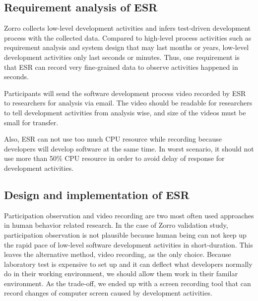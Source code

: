 \subsection{Requirement analysis of ESR}
Zorro collects low-level development activities and infers test-driven
development process with the collected data. Compared to high-level process
activities such as requirement analysis and system design that may last
months or years, low-level development activities only last seconds or
minutes. Thus, one requirement is that ESR can record very fine-grained
data to observe activities happened in seconds.

Participants will send the software development process video recorded by
ESR to researchers for analysis via email. The video should be readable for
researchers to tell development activities from analysis wise, and size of
the videos must be small for transfer. 

Also, ESR can not use too much CPU resource while recording because
developers will develop software at the same time. In worst scenario, it
should not use more than 50\% CPU resource in order to avoid delay of
response for development activities.

\subsection{Design and implementation of ESR}
Participation observation and video recording are two most often used
approaches in human behavior related research. In the case of Zorro
validation study, participation observation is not plausible because human
being can not keep up the rapid pace of low-level software development
activities in short-duration. This leaves the alternative method, video
recording, as the only choice. Because laboratory test is expensive to set
up and it can deflect what developers normally do in their working
environment, we should allow them work in their familar environment. As the
trade-off, we ended up with a screen recording tool that can record changes
of computer screen caused by development activities.

